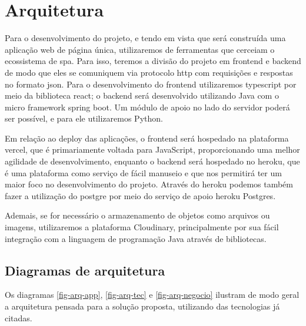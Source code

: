 \section{Arquitetura}
Para o desenvolvimento do projeto, e tendo em vista que será construída uma aplicação web de página única, utilizaremos de ferramentas que cerceiam o ecossistema de \ac{spa}. Para isso, teremos a divisão do projeto em \gls{frontend} e \gls{backend} de modo que eles se comuniquem via protocolo \ac{http} com requisições e respostas no formato \ac{json}. Para o desenvolvimento do \gls{frontend} utilizaremos \gls{typescript} por meio da biblioteca \gls{react}; o \gls{backend} será desenvolvido utilizando Java com o micro \gls{framework} \gls{spring boot}. Um módulo de apoio no lado do servidor poderá ser possível, e para ele utilizaremos Python. 

Em relação ao \gls{deploy} das aplicações, o \gls{frontend} será hospedado na plataforma \gls{vercel}, que é primariamente voltada para JavaScript, proporcionando uma melhor agilidade de desenvolvimento, enquanto o \gls{backend} será hospedado no \gls{heroku}, que é uma plataforma como serviço de fácil manuseio e que nos permitirá ter um maior foco no desenvolvimento do projeto. Através do \gls{heroku} podemos também fazer a utilização do \gls{postgre} por meio do serviço de apoio \gls{heroku} Postgres.

Ademais, se for necessário o armazenamento de objetos como arquivos ou imagens, utilizaremos a plataforma Cloudinary, principalmente por sua fácil integração com a linguagem de programação Java através de bibliotecas.

\subsection{Diagramas de arquitetura}
Os diagramas \autoref{fig-arq-app}, \autoref{fig-arq-tec} e \autoref{fig-arq-negocio} ilustram de modo geral a arquitetura pensada para a solução proposta, utilizando das tecnologias já citadas.

